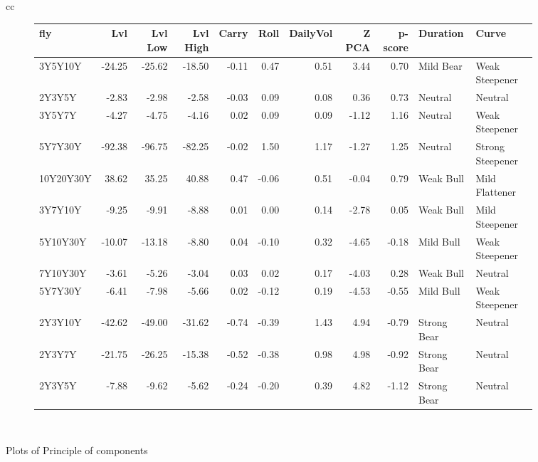 \documentclass[a4paper,oneside]{report}
\begin{document}
\begin{figure}[htbp]
\begin{tabular}[c]{cc}
 \begin{subfigure}[c]{0.5\textwidth}
 \begin{adjustbox}{max width=\textwidth}
 \begin{tabular}{lrrrrrrrrll}
\hline
       fly &    Lvl &  Lvl Low &  Lvl High &  Carry &  Roll &  DailyVol &  Z PCA &  p-score &     Duration &             Curve \\
\hline
   3Y5Y10Y & -24.25 &   -25.62 &    -18.50 &  -0.11 &  0.47 &      0.51 &   3.44 &     0.70 &    Mild Bear &    Weak Steepener \\
    2Y3Y5Y &  -2.83 &    -2.98 &     -2.58 &  -0.03 &  0.09 &      0.08 &   0.36 &     0.73 &      Neutral &           Neutral \\
    3Y5Y7Y &  -4.27 &    -4.75 &     -4.16 &   0.02 &  0.09 &      0.09 &  -1.12 &     1.16 &      Neutral &    Weak Steepener \\
   5Y7Y30Y & -92.38 &   -96.75 &    -82.25 &  -0.02 &  1.50 &      1.17 &  -1.27 &     1.25 &      Neutral &  Strong Steepener \\
 10Y20Y30Y &  38.62 &    35.25 &     40.88 &   0.47 & -0.06 &      0.51 &  -0.04 &     0.79 &    Weak Bull &    Mild Flattener \\
   3Y7Y10Y &  -9.25 &    -9.91 &     -8.88 &   0.01 &  0.00 &      0.14 &  -2.78 &     0.05 &    Weak Bull &    Mild Steepener \\
  5Y10Y30Y & -10.07 &   -13.18 &     -8.80 &   0.04 & -0.10 &      0.32 &  -4.65 &    -0.18 &    Mild Bull &    Weak Steepener \\
  7Y10Y30Y &  -3.61 &    -5.26 &     -3.04 &   0.03 &  0.02 &      0.17 &  -4.03 &     0.28 &    Weak Bull &           Neutral \\
   5Y7Y30Y &  -6.41 &    -7.98 &     -5.66 &   0.02 & -0.12 &      0.19 &  -4.53 &    -0.55 &    Mild Bull &    Weak Steepener \\
   2Y3Y10Y & -42.62 &   -49.00 &    -31.62 &  -0.74 & -0.39 &      1.43 &   4.94 &    -0.79 &  Strong Bear &           Neutral \\
    2Y3Y7Y & -21.75 &   -26.25 &    -15.38 &  -0.52 & -0.38 &      0.98 &   4.98 &    -0.92 &  Strong Bear &           Neutral \\
    2Y3Y5Y &  -7.88 &    -9.62 &     -5.62 &  -0.24 & -0.20 &      0.39 &   4.82 &    -1.12 &  Strong Bear &           Neutral \\
\hline
\end{tabular}
\end{adjustbox}
 \end{subfigure}\\
 
 
 
\end{tabular}
 \caption{Plots of Principle of components}\label{fig:bubble plots}
 \end{figure}  
\end{document}
